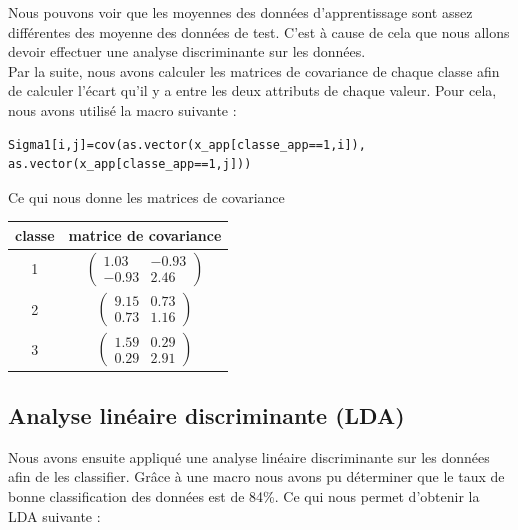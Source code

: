 \documentclass[a4paper,11pt]{article}
\begin{document}
  Nous pouvons voir que les moyennes des données d'apprentissage sont assez différentes des moyenne
  des données de test. C'est à cause de cela que nous allons devoir effectuer une analyse discriminante
  sur les données.\\
  
  Par la suite, nous avons calculer les matrices de covariance de chaque classe afin de calculer l'écart
  qu'il y a entre les deux attributs de chaque valeur. Pour cela, nous avons utilisé la macro suivante :
  
  \begin{lstlisting}[caption=Calcul de covariance de la classe d'apprentissage 1]
  Sigma1[i,j]=cov(as.vector(x_app[classe_app==1,i]), as.vector(x_app[classe_app==1,j]))
  \end{lstlisting}
  
  Ce qui nous donne les matrices de covariance
  \begin{center}
    \begin{tabular}{|c|c|}
    \hline
    classe & matrice de covariance\\
    \hline
    1 & 
    $\begin{pmatrix}
     1.03 & -0.93\\
     -0.93 & 2.46
    \end{pmatrix}$\\
    \hline
    2 & 
    $\begin{pmatrix}
     9.15 & 0.73\\
     0.73 & 1.16
    \end{pmatrix}$\\
    \hline
    3 & 
    $\begin{pmatrix}
     1.59 & 0.29\\
     0.29 & 2.91
    \end{pmatrix}$\\
    \hline
    \end{tabular}
  \end{center}
  
  \subsection{Analyse linéaire discriminante (LDA)}
  
  Nous avons ensuite appliqué une analyse linéaire discriminante sur les données afin de les 
  classifier. Grâce à une macro nous avons pu déterminer que le taux de
  bonne classification des données est de 84\%. Ce qui nous permet d'obtenir la LDA suivante :\\
  
\end{document}
